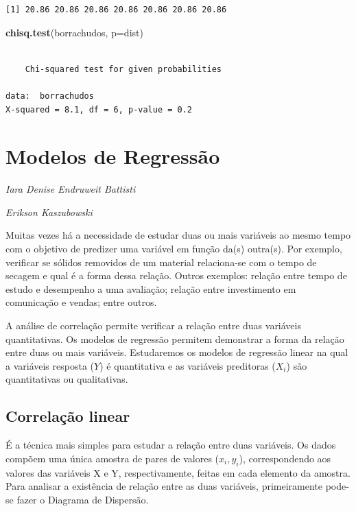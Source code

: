 \documentclass[12pt,brazil,]{book}
\newenvironment{Shaded}{\begin{snugshade}}{\end{snugshade}}
\newcommand{\DataTypeTok}[1]{\textcolor[rgb]{0.13,0.29,0.53}{#1}}
\newcommand{\KeywordTok}[1]{\textcolor[rgb]{0.13,0.29,0.53}{\textbf{#1}}}
\newcommand{\NormalTok}[1]{#1}
\begin{document}
\begin{verbatim}
[1] 20.86 20.86 20.86 20.86 20.86 20.86 20.86
\end{verbatim}

\begin{Shaded}
\begin{Highlighting}[]
\KeywordTok{chisq.test}\NormalTok{(borrachudos, }\DataTypeTok{p=}\NormalTok{dist)}
\end{Highlighting}
\end{Shaded}

\begin{verbatim}

    Chi-squared test for given probabilities

data:  borrachudos
X-squared = 8.1, df = 6, p-value = 0.2
\end{verbatim}

\hypertarget{modelos-de-regressao}{%
\chapter{Modelos de Regressão}\label{modelos-de-regressao}}

\begin{flushright}
\emph{Iara Denise Endruweit Battisti}

\emph{Erikson Kaszubowski}
\end{flushright}

Muitas vezes há a necessidade de estudar duas ou mais variáveis ao mesmo
tempo com o objetivo de predizer uma variável em função da(s) outra(s).
Por exemplo, verificar se sólidos removidos de um material relaciona-se
com o tempo de secagem e qual é a forma dessa relação. Outros exemplos:
relação entre tempo de estudo e desempenho a uma avaliação; relação
entre investimento em comunicação e vendas; entre outros.

A análise de correlação permite verificar a relação entre duas variáveis
quantitativas. Os modelos de regressão permitem demonstrar a forma da
relação entre duas ou mais variáveis. Estudaremos os modelos de
regressão linear na qual a variáveis resposta (\(Y\)) é quantitativa e
as variáveis preditoras (\(X_i\)) são quantitativas ou qualitativas.

\hypertarget{correlacao-linear}{%
\section{Correlação linear}\label{correlacao-linear}}

É a técnica mais simples para estudar a relação entre duas variáveis. Os
dados compõem uma única amostra de pares de valores (\(x_i, y_i\)),
correspondendo aos valores das variáveis X e Y, respectivamente, feitas
em cada elemento da amostra. Para analisar a existência de relação entre
as duas variáveis, primeiramente pode-se fazer o Diagrama de Dispersão.
\end{document}
